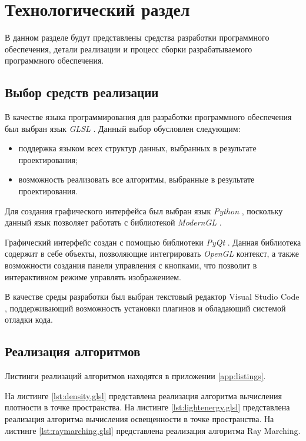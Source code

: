 \chapter{Технологический раздел}

В данном разделе будут представлены средства разработки программного обеспечения, детали реализации и процесс сборки разрабатываемого
программного обеспечения.

\section{Выбор средств реализации}

В качестве языка программирования для разработки программного обеспечения был выбран язык \textit{GLSL} \cite{glsl}. Данный выбор обусловлен следующим:
\begin{itemize}
	\item поддержка языком всех структур данных, выбранных в результате проектирования;
	\item возможность реализовать все алгоритмы, выбранные в результате проектирования.
\end{itemize}


Для создания графического интерфейса был выбран язык \textit{Python} \cite{python}, поскольку данный язык позволяет работать с библиотекой \textit{ModernGL} \cite{moderngl}.
 
Графический интерфейс создан с помощью библиотеки \textit{PyQt} \cite{pyqt}. Данная библиотека содержит в себе объекты, позволяющие интегрировать \textit{OpenGL} контекст, а также возможности создания панели управления с кнопками, что позволит в интерактивном режиме управлять изображением.

В качестве среды разработки был выбран текстовый редактор Visual Studio Code \cite{vsc}, поддерживающий возможность установки плагинов и обладающий системой отладки кода.


\section{Реализация алгоритмов}

Листинги реализаций алгоритмов находятся в приложении \ref{app:listings}.

На листинге \ref{lst:density.glsl} представлена реализация алгоритма вычисления плотности в точке пространства. На листинге \ref{lst:lightenergy.glsl} представлена реализация алгоритма вычисления освещенности в точке пространства. На листинге \ref{lst:raymarching.glsl} представлена реализация алгоритма Ray Marching.


